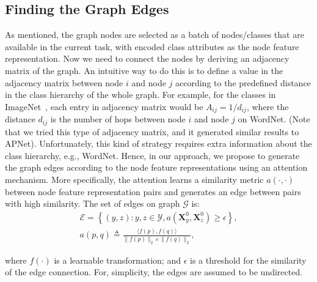 \documentclass[letterpaper]{article}
\def\mX{{\bm{X}}}
\begin{document}
\subsection{Finding the Graph Edges}
As mentioned, the graph nodes are selected as a batch of nodes/classes that are available in the current task, with encoded class attributes as the node feature representation. Now we need to connect the nodes by deriving an adjacency matrix of the graph. An intuitive way to do this is to define a value in the adjacency matrix between node $i$ and node $j$ according to the predefined distance in the class hierarchy of the whole graph. For example, for the classes in ImageNet~\cite{imagenet},
each entry in adjacency matrix would be $A_{ij} = 1/d_{ij}$, where the distance $d_{ij}$ is the number of hops between node $i$ and node $j$ on WordNet.
(Note that we tried this type of adjacency matrix, and it generated similar results to APNet). Unfortunately, this kind of strategy requires extra information about the class hierarchy, e.g., WordNet. Hence, in our approach, we propose to generate the graph edges according to the node feature representations using an attention mechanism. More specifically, the attention learns a similarity metric $a(\cdot, \cdot)$ between node feature representation pairs and generates an edge between pairs with high similarity. The set of edges on graph $\mathcal G$ is:
\begin{align}\label{equ:adj-generation}
\mathcal E = \left\{(y,z): y,z\in\mathcal Y, a(\mX_{y}^{0}, \mX_{z}^{0})\geq\epsilon\right\}, \\
a(p, q)\triangleq\frac{\langle f(p), f(q)\rangle}{\|f(p)\|_2 \times \|f(q)\|_2}, \label{equ:attention}
\end{align}

where $f(\cdot)$ is a learnable transformation; and $\epsilon$ is a threshold for the similarity of the edge connection. For, simplicity, the edges are assumed to be undirected.
\end{document}
